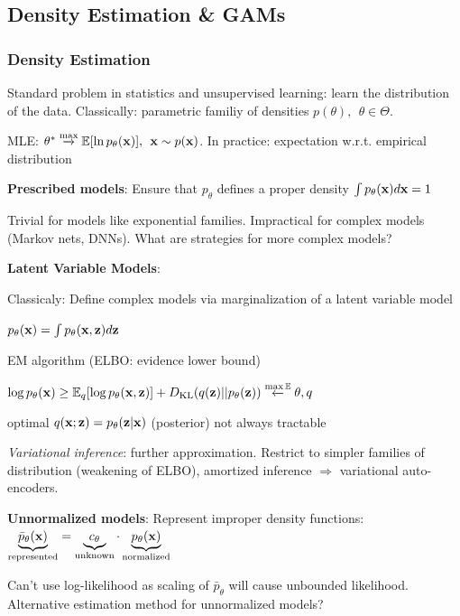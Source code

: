 \subsection{Density Estimation \& GAMs}
\label{sub:densityestimationandgams}

\subsubsection{Density Estimation}
\label{ssub:densityestimation}

Standard problem in statistics and unsupervised learning: learn the distribution of the data. Classically: parametric familiy of densities $p(\theta),\>\>\theta\in\Theta$.

MLE: $\theta^* \overset{\text{max}}{\xrightarrow{}} \mathbb E \lbrack \ln p_\theta (\mathbf x) \rbrack,\>\> \mathbf x\sim p(\mathbf x)$. In practice: expectation w.r.t. empirical distribution

\textbf{Prescribed models}: Ensure that $p_\theta$ defines a proper density $\int p_\theta(\mathbf x)d\mathbf x=1$

Trivial for models like exponential families. Impractical for complex models (Markov nets, DNNs). What are strategies for more complex models?

\textbf{Latent Variable Models}:

Classicaly: Define complex models via marginalization of a latent variable model

\tab $p_\theta(\mathbf x)=\int p_\theta(\mathbf x,\mathbf z)d\mathbf z$

EM algorithm (ELBO: evidence lower bound)

\tab $\log p_\theta(\mathbf x)\geq \mathbb E_{q} \lbrack \log p_\theta (\mathbf x,\mathbf z) \rbrack +D_{\text{KL}}(q(\mathbf z)||p_\theta(\mathbf z)) \overset{\max\mathbb E}{\xleftarrow{}}\theta,q$

\tab optimal $q(\mathbf x;\mathbf z)=p_\theta(\mathbf z|\mathbf x)$ (posterior) not always tractable

\emph{Variational inference}: further approximation. Restrict to simpler families of distribution (weakening of ELBO), amortized inference $\Rightarrow$ variational auto-encoders.

\textbf{Unnormalized models}: Represent improper density functions:\\ \tab$\underbrace{\bar{p}_\theta(\mathbf x)}_\text{represented}=\underbrace{c_\theta}_\text{unknown}\cdot \underbrace{p_\theta(\mathbf x)}_\text{normalized}$

Can't use log-likelihood as scaling of $\bar{p}_\theta$ will cause unbounded likelihood. Alternative estimation method for unnormalized models?

